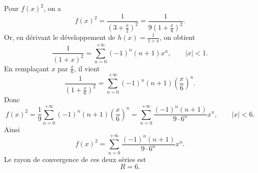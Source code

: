 {\begin{enumerate}
{Pour $f(x)^2$, on a
$$
f(x)^2=\frac{1}{\left(3+\frac{x}{2}\right)^2}
=\frac{1}{9\left(1+\frac{x}{6}\right)^2}.
$$
Or, en dérivant le développement de $h(x)=\frac{1}{1+x}$, on obtient
$$
\frac{1}{(1+x)^2}=\sum_{n=0}^{+\infty}(-1)^n(n+1)x^n,
\qquad |x|<1.
$$
En remplaçant $x$ par $\frac{x}{6}$, il vient
$$
\frac{1}{\left(1+\frac{x}{6}\right)^2}
=
\sum_{n=0}^{+\infty}(-1)^n(n+1)\left(\frac{x}{6}\right)^n.
$$
Donc
$$
f(x)^2
=
\frac19\sum_{n=0}^{+\infty}(-1)^n(n+1)\left(\frac{x}{6}\right)^n
=
\sum_{n=0}^{+\infty}\frac{(-1)^n(n+1)}{9\cdot 6^n}x^n,
\qquad |x|<6.
$$
Ainsi
$$
\boxed{f(x)^2=\sum_{n=0}^{+\infty}\frac{(-1)^n(n+1)}{9\cdot 6^n}x^n.}
$$
Le rayon de convergence de ces deux séries est
$$
\boxed{R=6.}
$$
}

\end{enumerate}

}
